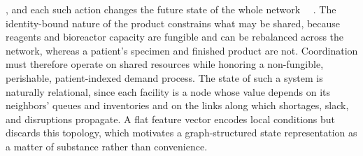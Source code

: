 \documentclass[preprint,review,12pt,nonatbib]{elsarticle}
\providecommand{\DIFadd}[1]{{\protect\color{blue}#1}} %
\providecommand{\DIFdel}[1]{} %
\providecommand{\DIFaddbegin}{} %
\providecommand{\DIFaddend}{} %
\providecommand{\DIFdelend}{} %
\providecommand{\DIFaddincludegraphics}[2][]{{\color{blue}\fbox{\DIFOincludegraphics[#1]{#2}}}} %
\DeclareRobustCommand{\DIFaddbegin}{\DIFOaddbegin \let\includegraphics\DIFaddincludegraphics} %
\DeclareRobustCommand{\DIFaddend}{\DIFOaddend \let\includegraphics\DIFOincludegraphics} %
\DeclareRobustCommand{\DIFdelend}{\DIFOaddend \let\includegraphics\DIFOincludegraphics} %
\begin{document}
\DIFdel{The artificial intelligence contribution of this study is not only the integration of graph convolutional representation learning with actor–critic reinforcement learning, but also the formulation of distributed PRM manufacturing as a graph-aware continuous operational control problem. The engineering application is adaptive capacity planning, consumable inventory replenishment, and network-level transshipment decision-making in distributed make-to-order PRM manufacturing networks. Unlike prediction-oriented supply-chain graph learning studies, this work focuses on coordinated decision-making under uncertainty, where continuous actions must be generated for capacity adjustment, replenishment, and transshipment while satisfying operational feasibility constraints}\DIFdelend \DIFaddbegin \DIFadd{, and each such action changes the future state of the whole network~\mbox{%
\cite{Li2023, Tseng2023DeepRL}}\hskip0pt%
. The identity-bound nature of the product constrains what may be shared, because reagents and bioreactor capacity are fungible and can be rebalanced across the network, whereas a patient's specimen and finished product are not. Coordination must therefore operate on shared resources while honoring a non-fungible, perishable, patient-indexed demand process. The state of such a system is naturally relational, since each facility is a node whose value depends on its neighbors' queues and inventories and on the links along which shortages, slack, and disruptions propagate. A flat feature vector encodes local conditions but discards this topology, which motivates a graph-structured state representation as a matter of substance rather than convenience}\DIFaddend .
\end{document}

